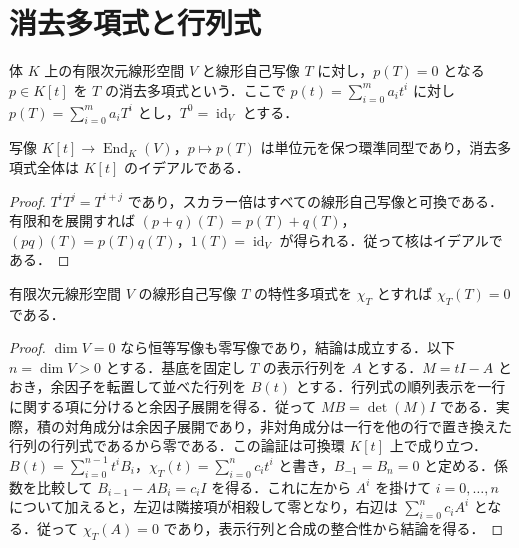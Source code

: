 \section{消去多項式と行列式}
\begin{defn}[消去多項式]
体 $K$ 上の有限次元線形空間 $V$ と線形自己写像 $T$ に対し，$p(T)=0$ となる $p\in K[t]$ を $T$ の消去多項式という．ここで $p(t)=\sum_{i=0}^m a_it^i$ に対し $p(T)=\sum_{i=0}^m a_i T^i$ とし，$T^0=\operatorname{id}_V$ とする．
\end{defn}
\begin{prop}[多項式の自己写像への代入]
写像 $K[t]\to\operatorname{End}_K(V)$，$p\mapsto p(T)$ は単位元を保つ環準同型であり，消去多項式全体は $K[t]$ のイデアルである．
\end{prop}
\begin{proof}
$T^iT^j=T^{i+j}$ であり，スカラー倍はすべての線形自己写像と可換である．有限和を展開すれば $(p+q)(T)=p(T)+q(T)$，$(pq)(T)=p(T)q(T)$，$1(T)=\operatorname{id}_V$ が得られる．従って核はイデアルである．
\end{proof}
\begin{prop}
有限次元線形空間 $V$ の線形自己写像 $T$ の特性多項式を $\chi_T$ とすれば $\chi_T(T)=0$ である．
\end{prop}
\begin{proof}
$\dim V=0$ なら恒等写像も零写像であり，結論は成立する．以下 $n=\dim V>0$ とする．基底を固定し $T$ の表示行列を $A$ とする．$M=tI-A$ とおき，余因子を転置して並べた行列を $B(t)$ とする．行列式の順列表示を一行に関する項に分けると余因子展開を得る．従って $MB=\det(M)I$ である．実際，積の対角成分は余因子展開であり，非対角成分は一行を他の行で置き換えた行列の行列式であるから零である．この論証は可換環 $K[t]$ 上で成り立つ．
$B(t)=\sum_{i=0}^{n-1}t^i B_i$，$\chi_T(t)=\sum_{i=0}^n c_it^i$ と書き，$B_{-1}=B_n=0$ と定める．係数を比較して $B_{i-1}-AB_i=c_iI$ を得る．これに左から $A^i$ を掛けて $i=0,\ldots,n$ について加えると，左辺は隣接項が相殺して零となり，右辺は $\sum_{i=0}^n c_iA^i$ となる．従って $\chi_T(A)=0$ であり，表示行列と合成の整合性から結論を得る．
\end{proof}
